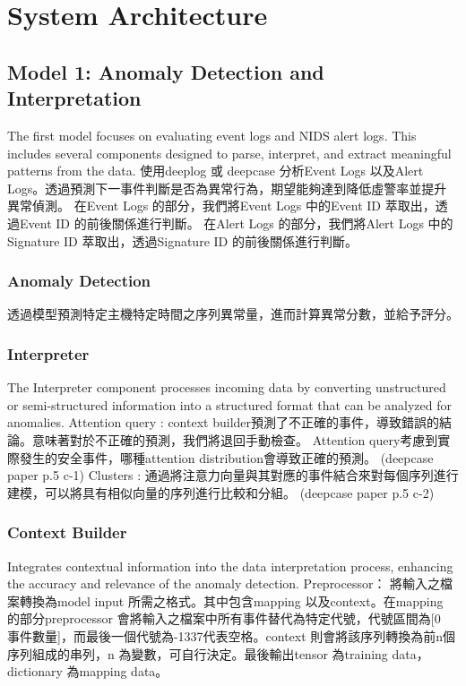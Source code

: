 \section{System Architecture}




\subsection{Model 1: Anomaly Detection and Interpretation}
The first model focuses on evaluating event logs and NIDS alert logs. This includes several components designed to parse, interpret, and extract meaningful patterns from the data.
使用deeplog 或 deepcase 分析Event Logs 以及Alert Logs。透過預測下一事件判斷是否為異常行為，期望能夠達到降低虛警率並提升異常偵測。
在Event Logs 的部分，我們將Event Logs 中的Event ID 萃取出，透過Event ID 的前後關係進行判斷。
在Alert Logs 的部分，我們將Alert Logs 中的Signature ID 萃取出，透過Signature ID 的前後關係進行判斷。

\subsubsection{Anomaly Detection}
透過模型預測特定主機特定時間之序列異常量，進而計算異常分數，並給予評分。

\subsubsection{Interpreter}
The Interpreter component processes incoming data by converting unstructured or semi-structured information into a structured format that can be analyzed for anomalies.
Attention query : context builder預測了不正確的事件，導致錯誤的結論。意味著對於不正確的預測，我們將退回手動檢查。
Attention query考慮到實際發生的安全事件，哪種attention distribution會導致正確的預測。
(deepcase paper p.5 c-1)
Clusters : 通過將注意力向量與其對應的事件結合來對每個序列進行建模，可以將具有相似向量的序列進行比較和分組。
(deepcase paper p.5 c-2)

\subsubsection{Context Builder}
Integrates contextual information into the data interpretation process, enhancing the accuracy and relevance of the anomaly detection.
Preprocessor：
將輸入之檔案轉換為model input 所需之格式。其中包含mapping 以及context。在mapping 的部分preprocessor 會將輸入之檔案中所有事件替代為特定代號，代號區間為[0 ~ 事件數量]，而最後一個代號為-1337代表空格。context 則會將該序列轉換為前n個序列組成的串列，n 為變數，可自行決定。最後輸出tensor 為training data，dictionary 為mapping data。

